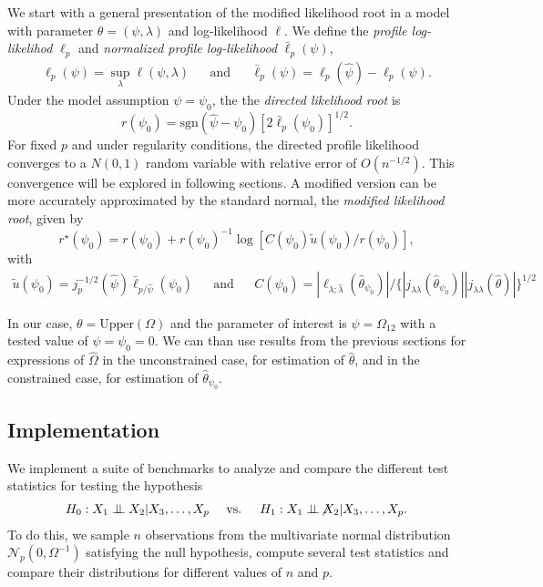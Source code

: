 We start with a general presentation of the modified   likelihood root in a model with parameter $\theta = (\psi, \lambda)$ and log-likelihood $\ell$. We define the \textit{profile log-likelihod} $\ell_p$ and \textit{normalized profile log-likelihood} $\bar\ell_p(\psi)$,
\begin{align*}
    \ell_p(\psi) = \sup_{\lambda} \ell(\psi, \lambda) && \text{and} && \bar\ell_p(\psi) = \ell_p(\hat\psi) - \ell_p(\psi).
\end{align*}
Under the model assumption $\psi = \psi_0$, the the \textit{directed likelihood root} is 
\begin{equation*}
    r(\psi_0) = \text{sgn}(\hat\psi - \psi_0)\left[2 \bar\ell_p(\psi_0)\right]^{1/2}.
\end{equation*}
For fixed $p$ and under regularity conditions, the directed profile likelihood converges to a $N(0, 1)$ random variable with relative error of $O(n^{-1/2})$. This convergence will be explored in following sections. A modified version can be more accurately approximated by the standard normal, the \textit{modified likelihood root}, given by
\begin{equation}
    r^\star(\psi_0) = r(\psi_0) + r(\psi_0)^{-1}\log\left[C(\psi_0)\tilde u(\psi_0) / r(\psi_0)\right],
\end{equation}
with
\begin{align*}
    \tilde u(\psi_0) = j_p^{-1/2}(\hat\psi)\bar\ell_{p/\hat\psi}(\psi_0) && \text{and} && C(\psi_0) = |\ell_{\lambda; \hat\lambda}(\hat\theta_{\psi_0})| / \{ |j_{\lambda\lambda}(\hat\theta_{\psi_0})||j_{\lambda\lambda}(\hat\theta)| \}^{1/2}
\end{align*}

In our case, $\theta = \text{Upper}(\Omega)$ and the parameter of interest is $\psi = \Omega_{12}$ with a tested value of $\psi = \psi_0 = 0$. We can than use results from the previous sections for expressions of $\hat\Omega$ in the unconstrained case, for estimation of $\hat\theta$, and in the constrained case, for estimation of $\hat\theta_{\psi_0}$.

\subsection{Implementation}
We implement a suite of benchmarks to analyze and compare the different test statistics for testing the hypothesis
\begin{align*}
    H_0: X_1 \independent X_2 | X_3, \ldots, X_p && \text{ vs. } && H_1: X_1 \notindependent X_2 | X_3, \ldots, X_p.
\end{align*}
To do this, we sample $n$ observations from the multivariate normal distribution $\mathcal{N}_p(0, \Omega^{-1})$ satisfying the null hypothesis, compute several test statistics and compare their distributions for different values of $n$ and $p$.

